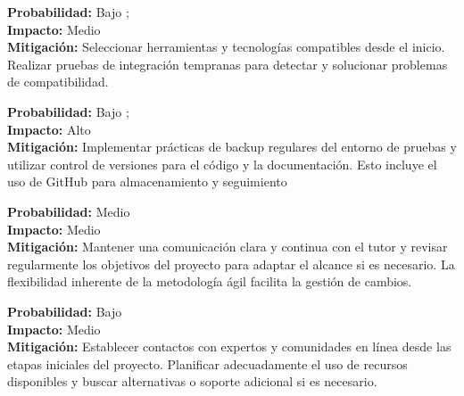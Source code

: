\begin{tcolorbox}[riskbox, title= Riesgo 4: Problemas de Integración de Herramientas]
\textbf{Probabilidad:} Bajo \baja; \\
\textbf{Impacto:} Medio \media\\
\textbf{Mitigación:} Seleccionar herramientas y tecnologías compatibles desde el inicio. Realizar pruebas de integración tempranas para detectar y solucionar problemas de compatibilidad.
\end{tcolorbox}

\begin{tcolorbox}[riskbox, title= Riesgo 5: Pérdida de Datos o Fallos en el Entorno de Pruebas]
\textbf{Probabilidad:} Bajo \baja; \\
\textbf{Impacto:} Alto \alta\\
\textbf{Mitigación:}  Implementar prácticas de backup regulares del entorno de pruebas y utilizar control de versiones para el código y la documentación. Esto incluye el uso de GitHub para almacenamiento y seguimiento
\end{tcolorbox}

\begin{tcolorbox}[riskbox, title= Riesgo 6: Cambios en los Requisitos o Alcance del Proyecto]
\textbf{Probabilidad:} Medio \media\\
\textbf{Impacto:} Medio \media\\
\textbf{Mitigación:}   Mantener una comunicación clara y continua con el tutor y revisar regularmente los objetivos del proyecto para adaptar el alcance si es necesario. La flexibilidad inherente de la metodología ágil facilita la gestión de cambios.
\end{tcolorbox}

\begin{tcolorbox}[riskbox, title= Riesgo 7. Acceso Limitado a Expertos o Recursos]
\textbf{Probabilidad:} Bajo \baja\\
\textbf{Impacto:} Medio \media\\
\textbf{Mitigación:}   Establecer contactos con expertos y comunidades en línea desde las etapas iniciales del proyecto. Planificar adecuadamente el uso de recursos disponibles y buscar alternativas o soporte adicional si es necesario.
\end{tcolorbox}